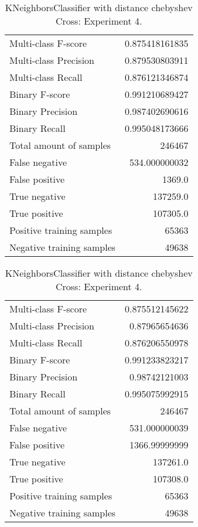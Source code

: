 \begin{table}[H]
\begin{minipage}{0.5\textwidth}
\caption{KNeighborsClassifier with distance chebyshev Cross: Experiment 3.}
\centering
\begin{tabular}{l r}
\toprule
Multi-class F-score & 0.875418161835 \\
Multi-class Precision & 0.879530803911 \\
Multi-class Recall & 0.876121346874 \\
\midrule
Binary F-score & 0.991210689427 \\
Binary Precision & 0.987402690616 \\
Binary Recall & 0.995048173666 \\
\midrule
Total amount of samples & 246467 \\
False negative & 534.000000032 \\
False positive & 1369.0 \\
True negative & 137259.0 \\
True positive & 107305.0 \\
\midrule
Positive training samples & 65363 \\
Negative training samples & 49638 \\
\bottomrule
\end{tabular}
\end{minipage}
\hfillx
\begin{minipage}{0.5\textwidth}
\caption{KNeighborsClassifier with distance chebyshev Cross: Experiment 4.}
\centering
\begin{tabular}{l r}
\toprule
Multi-class F-score & 0.875512145622 \\
Multi-class Precision & 0.87965654636 \\
Multi-class Recall & 0.876206550978 \\
\midrule
Binary F-score & 0.991233823217 \\
Binary Precision & 0.98742121003 \\
Binary Recall & 0.995075992915 \\
\midrule
Total amount of samples & 246467 \\
False negative & 531.000000039 \\
False positive & 1366.99999999 \\
True negative & 137261.0 \\
True positive & 107308.0 \\
\midrule
Positive training samples & 65363 \\
Negative training samples & 49638 \\
\bottomrule
\end{tabular}
\end{minipage}
\end{table}
